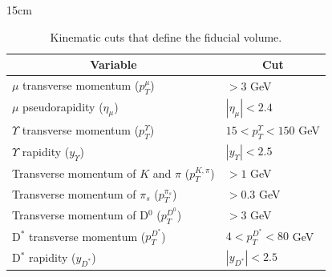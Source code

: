 \begin{table}[!htbp]{15cm}
  \caption{Kinematic cuts that define the fiducial volume.}
  \begin{tabular}{ l | l }
    \hline
    \multicolumn{1}{c|}{Variable}                         & \multicolumn{1}{|c}{Cut}      \\ \hline
    $\mu$ transverse momentum ($p_T^\mu$)                 & $> 3$ GeV                     \\ \hline
    $\mu$ pseudorapidity ($\eta_\mu$)                     & $|\eta_\mu| < 2.4$            \\ \hline
    $\Upsilon$ transverse momentum ($p_T^\Upsilon$)       & $15 < p_T^\Upsilon < 150$ GeV \\ \hline
    $\Upsilon$ rapidity ($y_\Upsilon$)                    & $|y_\Upsilon| < 2.5$          \\ \hline
    Transverse momentum of $K$ and $\pi$ ($p_T^{K, \pi}$) & $> 1$ GeV                     \\ \hline
    Transverse momentum of $\pi_s$ ($p_T^{\pi_s}$)        & $> 0.3$ GeV                   \\ \hline
    Transverse momentum of D$^0$ ($p_T^{D^0}$)            & $> 3$ GeV                     \\ \hline
    D$^*$ transverse momentum ($p_T^{D^*}$)               & $4 < p_T^{D^*} < 80$ GeV      \\ \hline
    D$^*$ rapidity ($y_{D^*}$)                            & $|y_{D^*}| < 2.5$             \\ \hline
  \end{tabular}
  \label{tab:fiducialvol}
\end{table}

